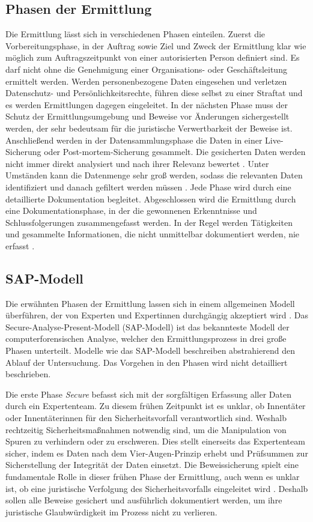 \documentclass[12pt,DIV=14, version=first, BCOR=10mm,a4paper,twoside,parskip=half-,headsepline,headinclude]{scrartcl}
\begin{document}
    \subsection{Phasen der Ermittlung}
    Die Ermittlung lässt sich in verschiedenen Phasen einteilen. Zuerst die Vorbereitungsphase, in der Auftrag sowie Ziel und Zweck der Ermittlung klar wie möglich zum Auftragszeitpunkt von einer autorisierten Person definiert sind. Es darf nicht ohne die Genehmigung einer Organisations- oder Geschäftsleitung ermittelt werden. Werden personenbezogene Daten eingesehen und verletzen Datenschutz- und Persönlichkeitsrechte, führen diese selbst zu einer Straftat und es werden Ermittlungen dagegen eingeleitet. In der nächsten Phase muss der Schutz der Ermittlungsumgebung und Beweise vor Änderungen sichergestellt werden, der sehr bedeutsam für die juristische Verwertbarkeit der Beweise ist. Anschließend werden in der Datensammlungsphase die Daten in einer Live-Sicherung oder Post-mortem-Sicherung gesammelt. Die gesicherten Daten werden nicht immer direkt analysiert und nach ihrer Relevanz bewertet \cite[vgl. S. 68]{texbook01}. Unter Umständen kann die Datenmenge sehr groß werden, sodass die relevanten Daten identifiziert und danach gefiltert werden müssen \cite[vgl. S. 116]{texbook02}. Jede Phase wird durch eine detaillierte Dokumentation begleitet. Abgeschlossen wird die Ermittlung durch eine Dokumentationsphase, in der die gewonnenen Erkenntnisse und Schlussfolgerungen zusammengefasst werden. In der Regel werden Tätigkeiten und gesammelte Informationen, die nicht unmittelbar dokumentiert werden, nie erfasst \cite[vgl. S. 68]{texbook01}.  
    
    \subsection{SAP-Modell} \label{SAP}
    Die erwähnten Phasen der Ermittlung lassen sich in einem allgemeinen Modell überführen, der von Experten und Expertinnen durchgängig akzeptiert wird \cite[vgl. S. 10]{texbook02}. Das Secure-Analyse-Present-Modell (SAP-Modell) ist das bekannteste Modell der computerforensischen Analyse, welcher den Ermittlungsprozess in drei große Phasen unterteilt. Modelle wie das SAP-Modell beschreiben abstrahierend den Ablauf der Untersuchung. Das Vorgehen in den Phasen wird nicht detailliert beschrieben.

    Die erste Phase \textit{Secure} befasst sich mit der sorgfältigen Erfassung aller Daten durch ein Expertenteam. Zu diesem frühen Zeitpunkt ist es unklar, ob Innentäter oder Innentäterinnen für den Sicherheitsvorfall verantwortlich sind. Weshalb rechtzeitig Sicherheitsmaßnahmen notwendig sind, um die Manipulation von Spuren zu verhindern oder zu erschweren. Dies stellt einerseits das Expertenteam sicher, indem es Daten nach dem Vier-Augen-Prinzip erhebt und Prüfsummen zur Sicherstellung der Integrität der Daten einsetzt. Die Beweissicherung spielt eine fundamentale Rolle in dieser frühen Phase der Ermittlung, auch wenn es unklar ist, ob eine juristische Verfolgung des Sicherheitsvorfalls eingeleitet wird \cite[vgl. S. 69]{texbook01}. Deshalb sollen alle Beweise gesichert und ausführlich dokumentiert werden, um ihre juristische Glaubwürdigkeit im Prozess nicht zu verlieren. 
\end{document}
